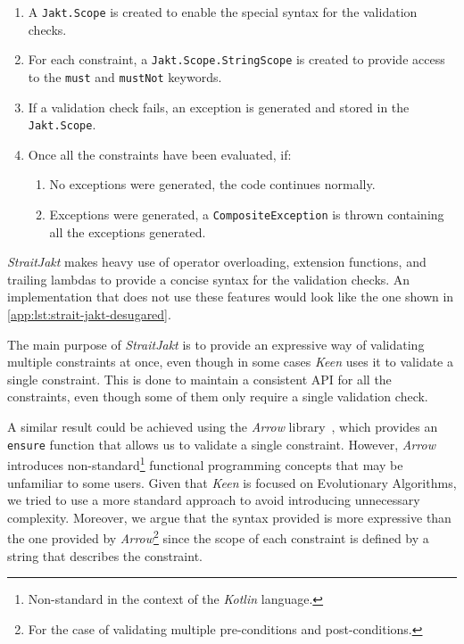         \begin{enumerate}
            \item A \texttt{Jakt.Scope} is created to enable the special syntax for the validation checks.
            \item For each constraint, a \texttt{Jakt.Scope.StringScope} is created to provide access to the
                \texttt{must} and \texttt{mustNot} keywords.
            \item If a validation check fails, an exception is generated and stored in the \texttt{Jakt.Scope}.
            \item Once all the constraints have been evaluated, if:
                \begin{enumerate}
                    \item No exceptions were generated, the code continues normally.
                    \item Exceptions were generated, a \texttt{CompositeException} is thrown containing all the
                        exceptions generated.
                \end{enumerate}
        \end{enumerate}

        \textit{StraitJakt} makes heavy use of operator overloading, extension functions, and trailing lambdas to
        provide a concise syntax for the validation checks. An implementation that does not use these features would
        look like the one shown in \vref{app:lst:strait-jakt-desugared}.
        
        The main purpose of \textit{StraitJakt} is to provide an expressive way of validating multiple constraints at
        once, even though in some cases \textit{Keen} uses it to validate a single constraint. This is done to maintain
        a consistent API for all the constraints, even though some of them only require a single validation check.

        A similar result could be achieved using the \textit{Arrow} library~\autocite{Arrow}, which provides an 
        \texttt{ensure} function that allows us to validate a single constraint. However, \textit{Arrow} introduces 
        non-standard\footnote{
            Non-standard in the context of the \textit{Kotlin} language.
        } functional programming concepts that may be unfamiliar to some users. Given that \textit{Keen} is focused on
        Evolutionary Algorithms, we tried to use a more standard approach to avoid introducing unnecessary complexity. 
        Moreover, we argue that the syntax provided is more expressive than the one provided by \textit{Arrow}\footnote{
            For the case of validating multiple pre-conditions and post-conditions.
        } since the scope of each constraint is defined by a string that describes the constraint.

